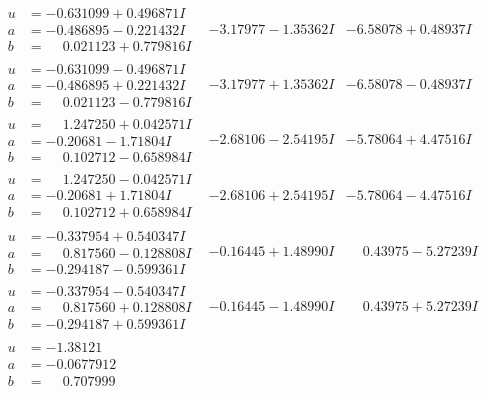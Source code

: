 \documentclass[1p]{elsarticle_modified}
\theoremstyle{definition}
\begin{document}
$$\begin{array}{c|c|c}
\begin{aligned}
u &= -0.631099 + 0.496871 I \\
a &= -0.486895 - 0.221432 I \\
b &= \phantom{-}0.021123 + 0.779816 I\end{aligned}
 & -3.17977 - 1.35362 I & -6.58078 + 0.48937 I \\ \hline\begin{aligned}
u &= -0.631099 - 0.496871 I \\
a &= -0.486895 + 0.221432 I \\
b &= \phantom{-}0.021123 - 0.779816 I\end{aligned}
 & -3.17977 + 1.35362 I & -6.58078 - 0.48937 I \\ \hline\begin{aligned}
u &= \phantom{-}1.247250 + 0.042571 I \\
a &= -0.20681 - 1.71804 I \\
b &= \phantom{-}0.102712 - 0.658984 I\end{aligned}
 & -2.68106 - 2.54195 I & -5.78064 + 4.47516 I \\ \hline\begin{aligned}
u &= \phantom{-}1.247250 - 0.042571 I \\
a &= -0.20681 + 1.71804 I \\
b &= \phantom{-}0.102712 + 0.658984 I\end{aligned}
 & -2.68106 + 2.54195 I & -5.78064 - 4.47516 I \\ \hline\begin{aligned}
u &= -0.337954 + 0.540347 I \\
a &= \phantom{-}0.817560 - 0.128808 I \\
b &= -0.294187 - 0.599361 I\end{aligned}
 & -0.16445 + 1.48990 I & \phantom{-}0.43975 - 5.27239 I \\ \hline\begin{aligned}
u &= -0.337954 - 0.540347 I \\
a &= \phantom{-}0.817560 + 0.128808 I \\
b &= -0.294187 + 0.599361 I\end{aligned}
 & -0.16445 - 1.48990 I & \phantom{-}0.43975 + 5.27239 I \\ \hline\begin{aligned}
u &= -1.38121\phantom{ +0.000000I} \\
a &= -0.0677912\phantom{ +0.000000I} \\
b &= \phantom{-}0.707999\phantom{ +0.000000I}\end{aligned}

\end{array}$$
\end{document}
